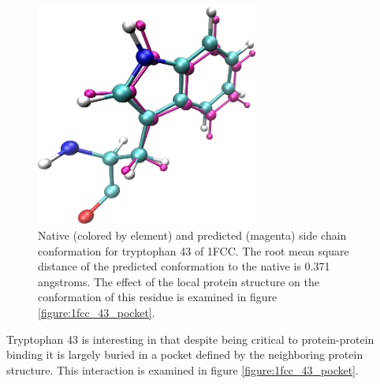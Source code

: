 \begin{figure}[h]
  \centering
  \includegraphics[width=0.65\textwidth,height=0.3\textheight,keepaspectratio]{figures/mutation_side_chain_images/1fcc_43.png}
  \caption{Native (colored by element) and predicted (magenta) side chain conformation for tryptophan 43 of 1FCC.
The root mean square distance of the predicted conformation to the native is 0.371 angstroms.
The effect of the local protein structure on the conformation of this residue is examined in figure \protect\ref{figure:1fcc_43_pocket}.}
  \label{figure:computational_mutation_scanning/1FCC_43}
\end{figure}
Tryptophan 43 is interesting in that despite being critical to protein-protein binding it is largely buried in a pocket defined by the neighboring protein structure.
This interaction is examined in figure \protect\ref{figure:1fcc_43_pocket}.
